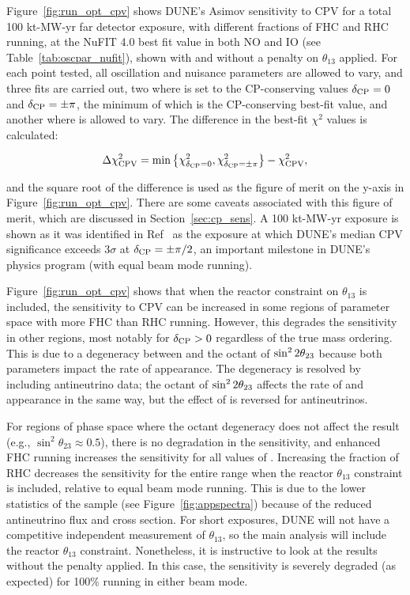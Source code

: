 Figure~\ref{fig:run_opt_cpv} shows DUNE's Asimov sensitivity to CPV for a total 100 kt-MW-yr far detector exposure, with different fractions of FHC and RHC running, at the NuFIT 4.0 best fit value in both NO and IO (see Table~\ref{tab:oscpar_nufit}), shown with and without a penalty on $\theta_{13}$ applied. For each point tested, all oscillation and nuisance parameters are allowed to vary, and three fits are carried out, two where \deltacp is set to the CP-conserving values $\delta_{\rm CP} = 0$ and $\delta_{\rm CP} = \pm\pi$, the minimum of which is the CP-conserving best-fit value, and another where \deltacp is allowed to vary. The difference in the best-fit $\chi^{2}$ values is calculated:
\begin{linenomath*}
  \begin{equation}
    \Delta\chi^{2}_{\mathrm{CPV}} = \min\left\{\chi^{2}_{\delta_{\rm CP} = 0},\chi^{2}_{\delta_{\rm CP} = \pm\pi}\right\} - \chi^{2}_{\mathrm{CPV}},
    \label{eq:cpv_chi2}
  \end{equation}
\end{linenomath*}
\noindent and the square root of the difference is used as the figure of merit on the y-axis in Figure~\ref{fig:run_opt_cpv}. There are some caveats associated with this figure of merit, which are discussed in Section~\ref{sec:cp_sens}. A 100 kt-MW-yr exposure is shown as it was identified in Ref~\cite{Abi:2020qib} as the exposure at which DUNE's median CPV significance exceeds 3$\sigma$ at $\delta_{\rm CP} = \pm\pi/2$, an important milestone in DUNE's physics program (with equal beam mode running). 

Figure~\ref{fig:run_opt_cpv} shows that when the reactor constraint on $\theta_{13}$ is included, the sensitivity to CPV can be increased in some regions of \deltacp parameter space with more FHC than RHC running. However, this degrades the sensitivity in other regions, most notably for $\delta_{\rm CP} > 0$ regardless of the true mass ordering. This is due to a degeneracy between \deltacp and the octant of $\sin^22\theta_{23}$ because both parameters impact the rate of \nue appearance. The degeneracy is resolved by including antineutrino data; the octant of $\sin^22\theta_{23}$ affects the rate of \nue and \anue appearance in the same way, but the effect of \deltacp is reversed for antineutrinos.

For regions of phase space where the octant degeneracy does not affect the result (e.g., $\sin^{2}\theta_{23} \approx 0.5$), there is no degradation in the sensitivity, and enhanced FHC running increases the sensitivity for all values of \deltacp. Increasing the fraction of RHC decreases the sensitivity for the entire \deltacp range when the reactor $\theta_{13}$ constraint is included, relative to equal beam mode running. This is due to the lower statistics of the \anue sample (see Figure~\ref{fig:appspectra}) because of the reduced antineutrino flux and cross section. For short exposures, DUNE will not have a competitive independent measurement of $\theta_{13}$, so the main analysis will include the reactor $\theta_{13}$ constraint. Nonetheless, it is instructive to look at the results without the penalty applied. In this case, the sensitivity is severely degraded (as expected) for 100\% running in either beam mode.


